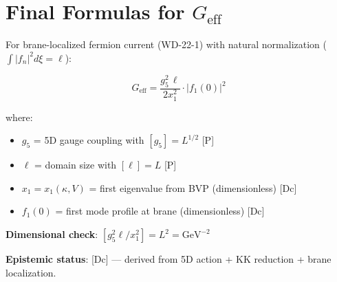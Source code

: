 
\section{Final Formulas for $G_{\text{eff}}$}
\label{sec:ch19_final}

\begin{tcolorbox}[colback=orange!5!white, colframe=orange!50!black,
    title=\textbf{Key Result: $G_{\text{eff}}$ in Natural Normalization}]

For brane-localized fermion current (WD-22-1) with natural normalization
($\int |f_n|^2 d\xi = \ell$):

\begin{equation}
    \boxed{G_{\text{eff}} = \frac{g_5^2 \, \ell}{2 x_1^2} \cdot |f_1(0)|^2}
    \label{eq:ch19_geff_natural}
\end{equation}

where:
\begin{itemize}
    \item $g_5$ = 5D gauge coupling with $[g_5] = L^{1/2}$ \hfill [P]
    \item $\ell$ = domain size with $[\ell] = L$ \hfill [P]
    \item $x_1 = x_1(\kappa, V)$ = first eigenvalue from BVP (dimensionless) \hfill [Dc]
    \item $f_1(0)$ = first mode profile at brane (dimensionless) \hfill [Dc]
\end{itemize}

\textbf{Dimensional check}: $[g_5^2 \ell / x_1^2] = L^2 = \text{GeV}^{-2}$ \checkmark

\textbf{Epistemic status}: [Dc] --- derived from 5D action + KK reduction + brane localization.

\end{tcolorbox}

